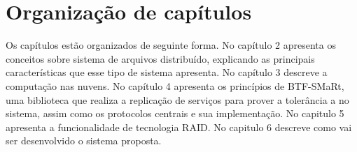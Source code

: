 
	\section{Organização de capítulos}
	
	Os capítulos estão organizados de seguinte forma. 
	No capítulo 2 apresenta os conceitos sobre sistema de arquivos distribuído, explicando as principais características que esse tipo de sistema apresenta. 
	No capítulo 3 descreve a computação nas nuvens. 
	No capítulo 4 apresenta os princípios de BTF-SMaRt, uma biblioteca que realiza a replicação de serviços para prover a tolerância a no sistema, assim como os protocolos centrais e sua implementação.
	No capitulo 5 apresenta a funcionalidade de tecnologia RAID.
	No capitulo 6 descreve como vai ser desenvolvido o sistema proposta.
